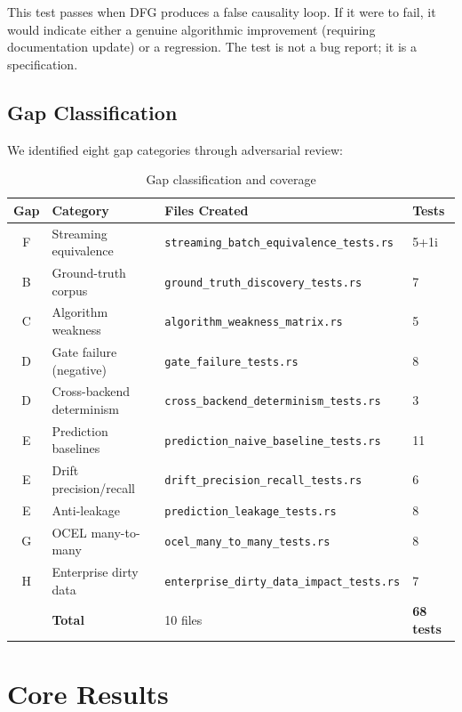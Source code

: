 \documentclass[12pt,a4paper]{article}
\begin{document}
This test passes when DFG produces a false causality loop. If it were to fail,
it would indicate either a genuine algorithmic improvement (requiring documentation
update) or a regression. The test is not a bug report; it is a specification.

\subsection{Gap Classification}

We identified eight gap categories through adversarial review:

\begin{table}[H]
  \centering
  \caption{Gap classification and coverage}
  \label{tab:gaps}
  \begin{tabular}{clll}
    \toprule
    \textbf{Gap} & \textbf{Category} & \textbf{Files Created} & \textbf{Tests} \\
    \midrule
    F & Streaming equivalence & \texttt{streaming\_batch\_equivalence\_tests.rs} & 5+1i \\
    B & Ground-truth corpus & \texttt{ground\_truth\_discovery\_tests.rs} & 7 \\
    C & Algorithm weakness & \texttt{algorithm\_weakness\_matrix.rs} & 5 \\
    D & Gate failure (negative) & \texttt{gate\_failure\_tests.rs} & 8 \\
    D & Cross-backend determinism & \texttt{cross\_backend\_determinism\_tests.rs} & 3 \\
    E & Prediction baselines & \texttt{prediction\_naive\_baseline\_tests.rs} & 11 \\
    E & Drift precision/recall & \texttt{drift\_precision\_recall\_tests.rs} & 6 \\
    E & Anti-leakage & \texttt{prediction\_leakage\_tests.rs} & 8 \\
    G & OCEL many-to-many & \texttt{ocel\_many\_to\_many\_tests.rs} & 8 \\
    H & Enterprise dirty data & \texttt{enterprise\_dirty\_data\_impact\_tests.rs} & 7 \\
    \midrule
    & \textbf{Total} & 10 files & \textbf{68 tests} \\
    \bottomrule
  \end{tabular}
\end{table}

\section{Core Results}
\label{sec:results}
\end{document}
